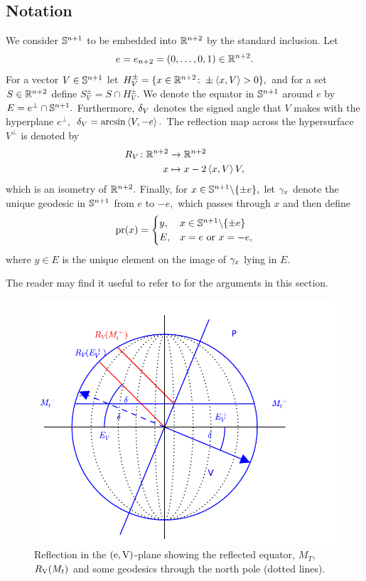 \documentclass{amsart}
\begin{document}
\subsection{Notation}
We consider $\S^{n+1}$ to be embedded into $\R^{n+2}$ by the standard inclusion.
Let
$$e=e_{n+2}=\br{0,\dots,0,1}\in \R^{n+2}.$$
For a vector $V\in \S^{n+1}$ let
$H_{V}^{\pm}=\{x\in\R^{n+2}\cn \pm\inpr{x}{V}>0\},$ and
for a set $S\in \R^{n+2}$ define
$S^{\pm}_{V}=S\cap H^{\pm}_{V}.$ We denote the equator in $\S^{n+1}$ around $e$ by
$E=e^{\perp}\cap \S^{n+1}.$
Furthermore, $\d_{V}$ denotes the signed angle that $V$ makes with the hyperplane $e^{\perp},$
$\d_{V}=\arcsin\inpr{V}{-e}.$
The reflection map across the hypersurface $V^{\perp}$ is denoted by
\begin{align*}
R_{V}\cn\R^{n+2}&\ra \R^{n+2}\\
            x&\mt x-2\inpr{x}{V}V,
            \end{align*}
which is an isometry of $\R^{n+2}.$
Finally, for $x\in \S^{n+1}\bs\{\pm e\},$
let $\g_{x}$ denote the unique geodesic in $\S^{n+1}$ from $e$ to $-e,$ which passes through $x$ and then define
\begin{align*}
\pr(x)=\begin{cases} y, & x\in \S^{n+1}\bs\{\pm e\}\\
                E, & x=e~\text{or}~x=-e,\end{cases}
                \end{align*}
where $y\in E$ is the unique element on the image of $\g_{x}$ lying in $E.$

The reader may find it useful to refer to  for the arguments in this section.
\begin{figure}[htb]
\centering
\includegraphics[width=.9\linewidth]{./reflection.pdf}
\caption{Reflection in the $(\vertvec, \reflectionvector)$-plane showing the reflected equator, \(M_T\), \(\reflectionmap(M_t)\) and some geodesics through the north pole (dotted lines).}
\label{fig:reflection}
\end{figure}
\end{document}
